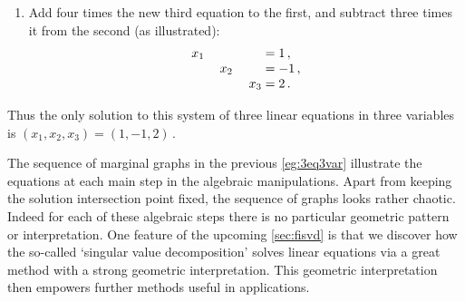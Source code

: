 \begin{example}
\begin{solution}
\begin{enumerate}
\item Add four times the new third equation to the first, and subtract three times it from the second (as illustrated):
%
\begin{equation*}
\begin{array}{r@{{}={}}l}
x_1\phantom{+x_2-4x_3}&1\,,\\
x_2\phantom{+3x_3}&-1\,,\\
x_3&2\,.
\end{array}
\end{equation*}
\end{enumerate}
Thus the only solution to this system of three linear equations in three variables is \((x_1,x_2,x_3)=(1,-1,2)\)\,.
\end{solution}
\end{example}

The sequence of marginal graphs in the previous \cref{eg:3eq3var} illustrate the equations at each main step in the algebraic manipulations.  
Apart from keeping the solution intersection point fixed, the sequence of graphs looks rather chaotic.
Indeed for each of these algebraic steps there is no particular geometric pattern or interpretation.
One feature of the upcoming \cref{sec:fisvd} is that we discover how the so-called `singular value decomposition' solves linear equations via a great method with a strong geometric interpretation.
This geometric interpretation then empowers further methods useful in applications.



